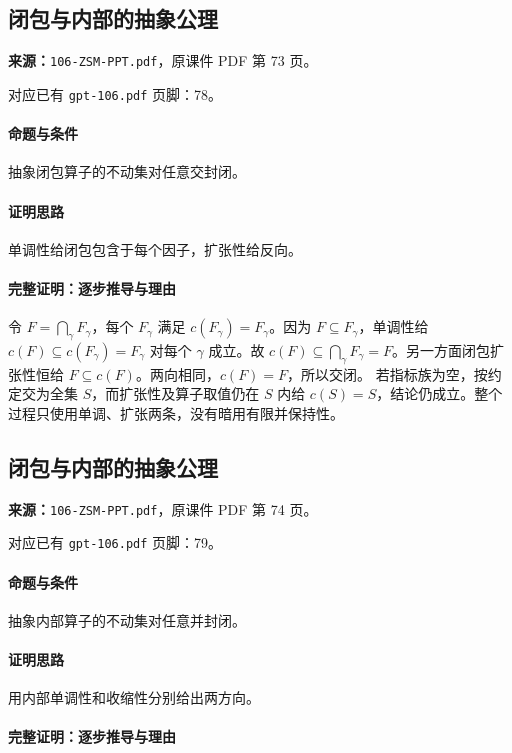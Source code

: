 \clearpage\subsection{闭包与内部的抽象公理}
\textbf{来源：}\texttt{106-ZSM-PPT.pdf}，原课件 PDF 第 73 页。\par
对应已有 \texttt{gpt-106.pdf} 页脚：78。\par
\paragraph{命题与条件}抽象闭包算子的不动集对任意交封闭。
\paragraph{证明思路}单调性给闭包包含于每个因子，扩张性给反向。
\paragraph{完整证明：逐步推导与理由}

令 $F=\bigcap_\gamma F_\gamma$，每个 $F_\gamma$ 满足 $c(F_\gamma)=F_\gamma$。因为 $F\subseteq F_\gamma$，单调性给 $c(F)\subseteq c(F_\gamma)=F_\gamma$ 对每个 $\gamma$ 成立。故 $c(F)\subseteq\bigcap_\gamma F_\gamma=F$。另一方面闭包扩张性恒给 $F\subseteq c(F)$。两向相同，$c(F)=F$，所以交闭。
若指标族为空，按约定交为全集 $S$，而扩张性及算子取值仍在 $S$ 内给 $c(S)=S$，结论仍成立。整个过程只使用单调、扩张两条，没有暗用有限并保持性。

\clearpage\subsection{闭包与内部的抽象公理}
\textbf{来源：}\texttt{106-ZSM-PPT.pdf}，原课件 PDF 第 74 页。\par
对应已有 \texttt{gpt-106.pdf} 页脚：79。\par
\paragraph{命题与条件}抽象内部算子的不动集对任意并封闭。
\paragraph{证明思路}用内部单调性和收缩性分别给出两方向。
\paragraph{完整证明：逐步推导与理由}

